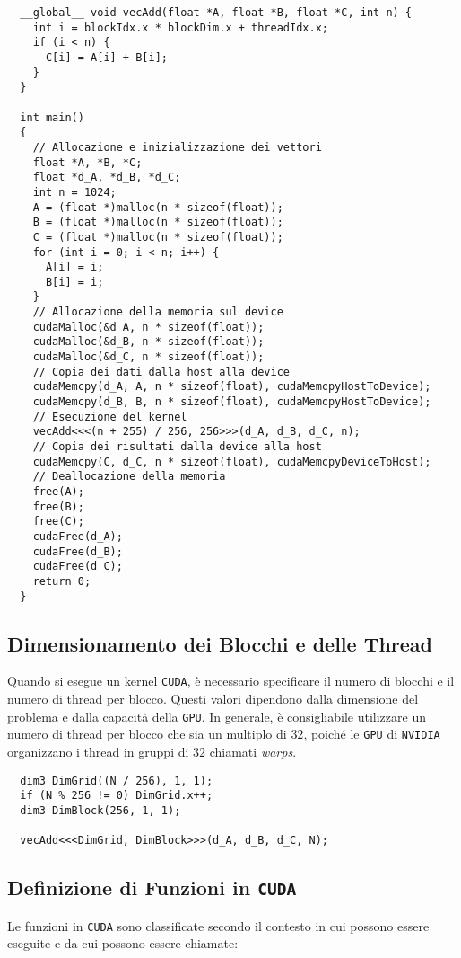 \begin{lstlisting}
  __global__ void vecAdd(float *A, float *B, float *C, int n) {
    int i = blockIdx.x * blockDim.x + threadIdx.x;
    if (i < n) {
      C[i] = A[i] + B[i];
    }
  }

  int main()
  {
    // Allocazione e inizializzazione dei vettori
    float *A, *B, *C;
    float *d_A, *d_B, *d_C;
    int n = 1024;
    A = (float *)malloc(n * sizeof(float));
    B = (float *)malloc(n * sizeof(float));
    C = (float *)malloc(n * sizeof(float));
    for (int i = 0; i < n; i++) {
      A[i] = i;
      B[i] = i;
    }
    // Allocazione della memoria sul device
    cudaMalloc(&d_A, n * sizeof(float));
    cudaMalloc(&d_B, n * sizeof(float));
    cudaMalloc(&d_C, n * sizeof(float));
    // Copia dei dati dalla host alla device
    cudaMemcpy(d_A, A, n * sizeof(float), cudaMemcpyHostToDevice);
    cudaMemcpy(d_B, B, n * sizeof(float), cudaMemcpyHostToDevice);
    // Esecuzione del kernel
    vecAdd<<<(n + 255) / 256, 256>>>(d_A, d_B, d_C, n);
    // Copia dei risultati dalla device alla host
    cudaMemcpy(C, d_C, n * sizeof(float), cudaMemcpyDeviceToHost);
    // Deallocazione della memoria
    free(A);
    free(B);
    free(C);
    cudaFree(d_A);
    cudaFree(d_B);
    cudaFree(d_C);
    return 0;
  }
\end{lstlisting}

\subsection{Dimensionamento dei Blocchi e delle Thread}
Quando si esegue un kernel \texttt{CUDA}, è necessario specificare
il numero di blocchi e il numero di thread per blocco. Questi valori
dipendono dalla dimensione del problema e dalla capacità della \texttt{GPU}.
In generale, è consigliabile utilizzare un numero di thread per blocco
che sia un multiplo di \(32\), poiché le \texttt{GPU} di \texttt{NVIDIA}
organizzano i thread in gruppi di \(32\) chiamati \textit{warps}.
\begin{lstlisting}
  dim3 DimGrid((N / 256), 1, 1);
  if (N % 256 != 0) DimGrid.x++;
  dim3 DimBlock(256, 1, 1);

  vecAdd<<<DimGrid, DimBlock>>>(d_A, d_B, d_C, N);
\end{lstlisting}
\subsection{Definizione di Funzioni in \texttt{CUDA}}

Le funzioni in \texttt{CUDA} sono classificate secondo il contesto in
cui possono essere eseguite e da cui possono essere chiamate:

